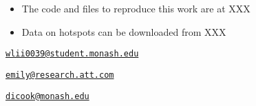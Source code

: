 \begin{itemize}
\tightlist
\item
  The code and files to reproduce this work are at XXX
\item
  Data on hotspots can be downloaded from XXX
\end{itemize}




\address{%
Weihao Li\\
Monash University\\
line 1\\ line 2\\
}
\href{mailto:wlii0039@student.monash.edu}{\nolinkurl{wlii0039@student.monash.edu}}

\address{%
Emily Dodwell\\
AT\&T\\
line 1\\ line 2\\
}
\href{mailto:emily@research.att.com}{\nolinkurl{emily@research.att.com}}

\address{%
Dianne Cook\\
Monash University\\
line 1\\ line 2\\
}
\href{mailto:dicook@monash.edu}{\nolinkurl{dicook@monash.edu}}

